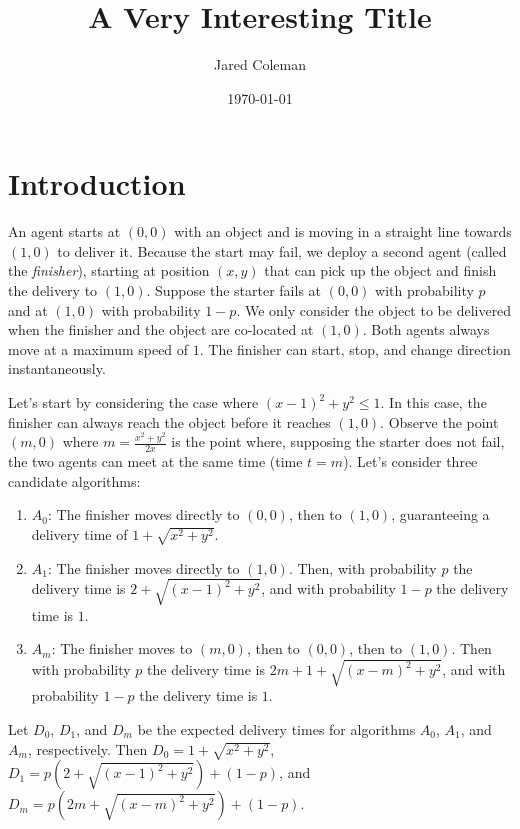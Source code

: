 \documentclass{article}
\title{A Very Interesting Title}
\author[1]{Jared Coleman}
\affil[1]{Loyola Marymount University}
\date{\today}
\begin{document}
\maketitle

\begin{abstract}
\lipsum[1]
\end{abstract}


\section{Introduction}

An agent starts at $(0, 0)$ with an object and is moving in a straight line towards $(1,0)$ to deliver it.
Because the start may fail, we deploy a second agent (called the \textit{finisher}), starting at position $(x,y)$ that can pick up the object and finish the delivery to $(1,0)$.
Suppose the starter fails at $(0,0)$ with probability $p$ and at $(1,0)$ with probability $1-p$.
We only consider the object to be delivered when the finisher and the object are co-located at $(1,0)$.
Both agents always move at a maximum speed of $1$. The finisher can start, stop, and change direction instantaneously.

Let's start by considering the case where $(x-1)^2 + y^2 \leq 1$.
In this case, the finisher can always reach the object before it reaches $(1,0)$.
Observe the point $(m, 0)$ where $m = \frac{x^2 + y^2}{2x}$ is the point where, supposing the starter does not fail, the two agents can meet at the same time (time $t = m$).
Let's consider three candidate algorithms:
\begin{enumerate}
    \item $A_0$: The finisher moves directly to $(0,0)$, then to $(1,0)$, guaranteeing a delivery time of $1+\sqrt{x^2 + y^2}$.
    \item $A_1$: The finisher moves directly to $(1,0)$. Then, with probability $p$ the delivery time is $2+\sqrt{(x-1)^2 + y^2}$, and with probability $1-p$ the delivery time is $1$.
    \item $A_m$: The finisher moves to $(m,0)$, then to $(0,0)$, then to $(1,0)$. Then with probability $p$ the delivery time is $2m + 1 + \sqrt{(x-m)^2 + y^2}$, and with probability $1-p$ the delivery time is $1$.
\end{enumerate}
Let $D_0$, $D_1$, and $D_m$ be the expected delivery times for algorithms $A_0$, $A_1$, and $A_m$, respectively.
Then $D_0 = 1 + \sqrt{x^2 + y^2}$, $D_1 = p(2 + \sqrt{(x-1)^2 + y^2}) + (1-p)$, and $D_m = p(2m + \sqrt{(x-m)^2 + y^2}) + (1-p)$.


\printbibliography
\end{document}
